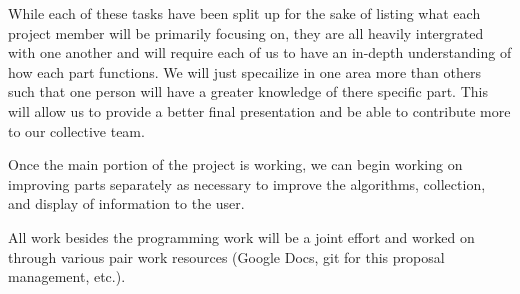 \documentclass{acm_proc_article-sp}
\begin{document}
While each of these tasks have been split up for the sake of listing what each project
member will be primarily focusing on, they are all heavily intergrated with one another
and will require each of us to have an in-depth understanding of how each part functions.
We will just specailize in one area more than others such that one person will have a greater
knowledge of there specific part. This will allow us to provide a better final presentation and
be able to contribute more to our collective team.


Once the main portion of the project is working, we can begin working on improving parts
separately as necessary to improve the algorithms, collection, and display of information
to the user.

All work besides the programming work will be a joint effort and worked on through various pair work resources
(Google Docs, git for this proposal management, etc.).


%

%
%


\end{document}
